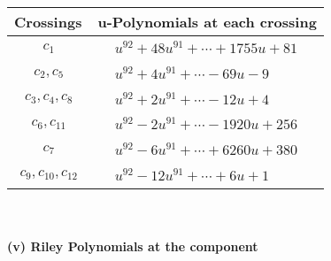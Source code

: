 \documentclass[1p]{elsarticle_modified}
\theoremstyle{definition}
\begin{document}
\begin{tabular}{m{50pt}|m{274pt}}
Crossings & \hspace{64pt}u-Polynomials at each crossing \\
\hline $$\begin{aligned}c_{1}\end{aligned}$$&$\begin{aligned}
&u^{92}+48 u^{91}+\cdots+1755 u+81
\end{aligned}$\\
\hline $$\begin{aligned}c_{2},c_{5}\end{aligned}$$&$\begin{aligned}
&u^{92}+4 u^{91}+\cdots-69 u-9
\end{aligned}$\\
\hline $$\begin{aligned}c_{3},c_{4},c_{8}\end{aligned}$$&$\begin{aligned}
&u^{92}+2 u^{91}+\cdots-12 u+4
\end{aligned}$\\
\hline $$\begin{aligned}c_{6},c_{11}\end{aligned}$$&$\begin{aligned}
&u^{92}-2 u^{91}+\cdots-1920 u+256
\end{aligned}$\\
\hline $$\begin{aligned}c_{7}\end{aligned}$$&$\begin{aligned}
&u^{92}-6 u^{91}+\cdots+6260 u+380
\end{aligned}$\\
\hline $$\begin{aligned}c_{9},c_{10},c_{12}\end{aligned}$$&$\begin{aligned}
&u^{92}-12 u^{91}+\cdots+6 u+1
\end{aligned}$\\
\hline
\end{tabular}\\~\\
\newpage\renewcommand{\arraystretch}{1}
\flushleft \textbf{(v) Riley Polynomials at the component}\newline \\
\end{document}
